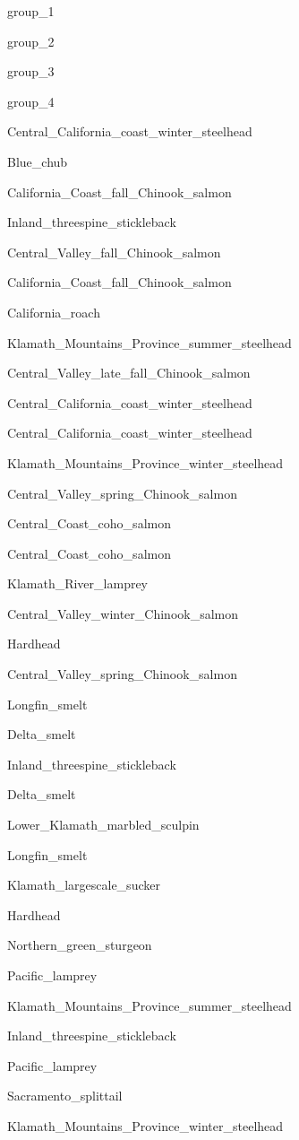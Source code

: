 \documentclass[]{article}
\begin{document}
group\_1

group\_2

group\_3

group\_4

Central\_California\_coast\_winter\_steelhead

Blue\_chub

California\_Coast\_fall\_Chinook\_salmon

Inland\_threespine\_stickleback

Central\_Valley\_fall\_Chinook\_salmon

California\_Coast\_fall\_Chinook\_salmon

California\_roach

Klamath\_Mountains\_Province\_summer\_steelhead

Central\_Valley\_late\_fall\_Chinook\_salmon

Central\_California\_coast\_winter\_steelhead

Central\_California\_coast\_winter\_steelhead

Klamath\_Mountains\_Province\_winter\_steelhead

Central\_Valley\_spring\_Chinook\_salmon

Central\_Coast\_coho\_salmon

Central\_Coast\_coho\_salmon

Klamath\_River\_lamprey

Central\_Valley\_winter\_Chinook\_salmon

Hardhead

Central\_Valley\_spring\_Chinook\_salmon

Longfin\_smelt

Delta\_smelt

Inland\_threespine\_stickleback

Delta\_smelt

Lower\_Klamath\_marbled\_sculpin

Longfin\_smelt

Klamath\_largescale\_sucker

Hardhead

Northern\_green\_sturgeon

Pacific\_lamprey

Klamath\_Mountains\_Province\_summer\_steelhead

Inland\_threespine\_stickleback

Pacific\_lamprey

Sacramento\_splittail

Klamath\_Mountains\_Province\_winter\_steelhead
\end{document}
